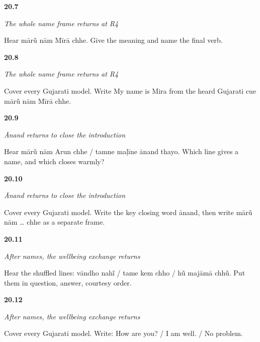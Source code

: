 \noindent\begin{minipage}[t]{\linewidth}
\raggedright
\hypertarget{review-GU-R16-my-name-is-r4-listening}{\textbf{20.7}} \emph{The whole name frame returns at R4}\par
\small Hear mārũ nām Mīrā chhe. Give the meaning and name the final verb.
\end{minipage}\par\medskip

\noindent\begin{minipage}[t]{\linewidth}
\raggedright
\hypertarget{review-GU-R16-my-name-is-r4-writing}{\textbf{20.8}} \emph{The whole name frame returns at R4}\par
\small Cover every Gujarati model. Write My name is Mira from the heard Gujarati cue mārũ nām Mīrā chhe.
\end{minipage}\par\medskip

\noindent\begin{minipage}[t]{\linewidth}
\raggedright
\hypertarget{review-GU-R16-anand-r4-listening}{\textbf{20.9}} \emph{Ānand returns to close the introduction}\par
\small Hear mārũ nām Arun chhe / tamne maḷīne ānand thayo. Which line gives a name, and which closes warmly?
\end{minipage}\par\medskip

\noindent\begin{minipage}[t]{\linewidth}
\raggedright
\hypertarget{review-GU-R16-anand-r4-writing}{\textbf{20.10}} \emph{Ānand returns to close the introduction}\par
\small Cover every Gujarati model. Write the key closing word ānand, then write mārũ nām … chhe as a separate frame.
\end{minipage}\par\medskip

\noindent\begin{minipage}[t]{\linewidth}
\raggedright
\hypertarget{review-GU-R16-wellbeing-r3-listening}{\textbf{20.11}} \emph{After names, the wellbeing exchange returns}\par
\small Hear the shuffled lines: vāndho nahĩ / tame kem chho / hũ majāmā chhũ. Put them in question, answer, courtesy order.
\end{minipage}\par\medskip

\noindent\begin{minipage}[t]{\linewidth}
\raggedright
\hypertarget{review-GU-R16-wellbeing-r3-writing}{\textbf{20.12}} \emph{After names, the wellbeing exchange returns}\par
\small Cover every Gujarati model. Write: How are you? / I am well. / No problem.
\end{minipage}\par\medskip

